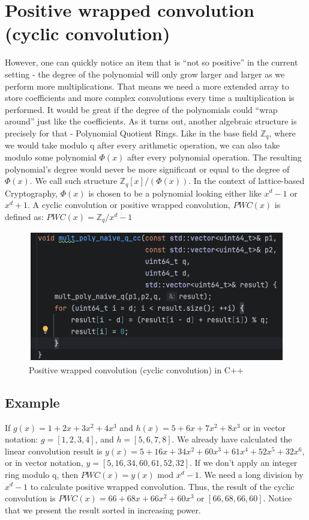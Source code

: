 \documentclass{techrep}
\theoremstyle{definition}
\theoremstyle{plain}
\newcommand{\Z}{\mathbb{Z}}
\begin{document}
\section{Positive wrapped convolution (cyclic convolution)}
However, one can quickly notice an item that is “not so positive” in the current setting - the degree of the polynomial will only grow larger and larger as we perform more multiplications. That means we need a more extended array to store coefficients and more complex convolutions every time a multiplication is performed. It would be great if the degree of the polynomials could “wrap around” just like the coefficients. As it turns out, another algebraic structure is precisely for that - Polynomial Quotient Rings. Like in the base field  $\Z_{q}$, where we would take modulo q after every arithmetic operation, we can also take modulo some polynomial $\Phi(x)$ after every polynomial operation. The resulting polynomial’s degree would never be more significant or equal to the degree of $\Phi(x)$. We call such structure $\Z_{q}[x]/(\Phi(x))$. In the context of lattice-based Cryptography, $\Phi(x)$ is chosen to be a polynomial looking either like $x^d - 1$ or $x^d + 1$.  A cyclic convolution or positive wrapped convolution, $PWC(x)$ is defined as: $PWC(x) = \Z_{q}/x^d - 1$  


\begin{figure}[H]
 	\centering
 	\includegraphics[width=.9\columnwidth]{fig/PWC_cplus.png}
 	\caption{Positive wrapped convolution (cyclic convolution) in C++} 
\label{fig:PWC_cplus}
\end{figure}



\subsection{Example}
If $g(x) = 1 + 2x + 3x^2 + 4x^3$ and $h(x) = 5 + 6x + 7x^2 + 8x^3$ or in vector notation:  $g = [1, 2, 3, 4]$, and $h = [5, 6, 7, 8]$. We already have calculated the linear convolution result is $y(x) = 5 + 16x + 34x^2 + 60x^3 + 61x^4 + 52x^5 + 32x^6$, or in vector notation, $y = [5, 16, 34, 60, 61, 52, 32]$. If we don't apply an integer ring modulo q, then $PWC(x) = y(x)$ mod $x^d - 1$.  We need a long division by $x^d - 1$ to calculate positive wrapped convolution. Thus, the result of the cyclic convolution is $PWC(x) = 66 + 68x + 66x^2 + 60x^3$ or $[66, 68, 66, 60]$. Notice that we present the result sorted in increasing power.
\end{document}
